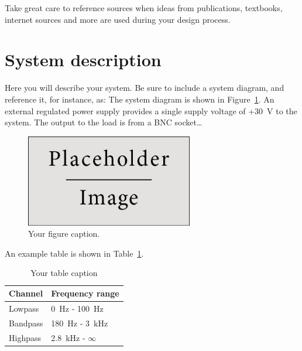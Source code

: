 \documentclass[11pt,a4paper]{article}
\begin{document}
Take great care to reference sources when ideas from publications, textbooks, internet sources and more are used during your design process.


\section{System description}\label{sec:desc}
Here you will describe your system. Be sure to include a system diagram, and reference it, for instance, as: The system diagram is shown in Figure~\ref{fig:place}. An external regulated power supply provides a single supply voltage of +\SI{30}{\volt} to the system. The output to the load is from a BNC socket\ldots

\begin{figure}[ht]
    \begin{center}
        \includegraphics[width=0.65\textwidth]{placeholder} %
        \caption{Your figure caption.}
        \label{fig:place}
    \end{center}
\end{figure}

An example table is shown in Table~\ref{tab:channel}.
\begin{table}[ht]
    \begin{center}
        \caption{Your table caption}
        \begin{tabular}{ l l }
            \hline
            Channel & Frequency range\\
            \hline
            Lowpass & \SI{0}{\hertz} - \SI{100}{\hertz}\\
            Bandpass & \SI{180}{\hertz} - \SI{3}{\kilo\hertz}\\
            Highpass & \SI{2.8}{\kilo\hertz} - $\infty$\\
            \hline
        \end{tabular}
        \label{tab:channel}
    \end{center}
\end{table}
\end{document}
